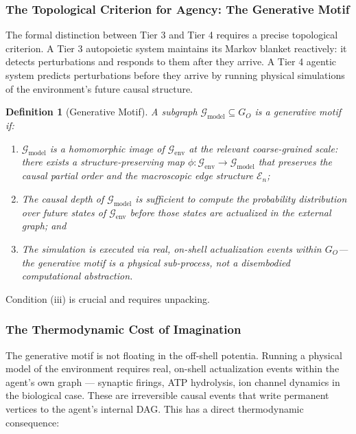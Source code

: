 \documentclass[11pt,a4paper]{article}
\newtheorem{definition}[theorem]{Definition}
\theoremstyle{remark}
\newcommand{\GG}{\mathcal{G}}
\newcommand{\EE}{\mathcal{E}}
\begin{document}
\subsubsection{The Topological Criterion for Agency: The Generative Motif}
\label{subsec:generative}

The formal distinction between Tier 3 and Tier 4 requires a precise topological
criterion. A Tier 3 autopoietic system maintains its Markov blanket reactively:
it detects perturbations and responds to them after they arrive. A Tier 4 agentic
system predicts perturbations before they arrive by running physical simulations
of the environment's future causal structure.

\begin{definition}[Generative Motif]
A subgraph $\GG_{\mathrm{model}} \subseteq G_O$ is a \emph{generative motif} if:
\begin{enumerate}[noitemsep, label=(\roman*)]
  \item $\GG_{\mathrm{model}}$ is a homomorphic image of $\GG_{\mathrm{env}}$ at
    the relevant coarse-grained scale: there exists a structure-preserving map
    $\phi: \GG_{\mathrm{env}} \to \GG_{\mathrm{model}}$ that preserves the
    causal partial order and the macroscopic edge structure $\EE_n$;
  \item The causal depth of $\GG_{\mathrm{model}}$ is sufficient to compute the
    probability distribution over future states of $\GG_{\mathrm{env}}$ before
    those states are actualized in the external graph; and
  \item The simulation is executed via real, on-shell actualization events within
    $G_O$---the generative motif is a physical sub-process, not a disembodied
    computational abstraction.
\end{enumerate}
\end{definition}

Condition (iii) is crucial and requires unpacking.

\subsubsection{The Thermodynamic Cost of Imagination}
\label{subsec:imagination_cost}

The generative motif is not floating in the off-shell potentia. Running a physical
model of the environment requires real, on-shell actualization events within the
agent's own graph --- synaptic firings, ATP hydrolysis, ion channel dynamics in
the biological case. These are irreversible causal events that write permanent
vertices to the agent's internal DAG. This has a direct thermodynamic consequence:
\end{document}
